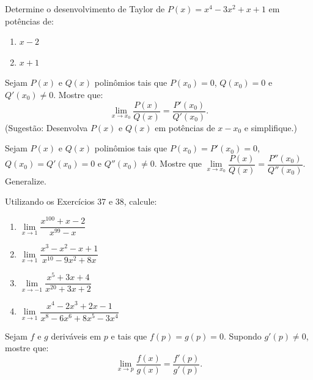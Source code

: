 \begin{exercicio}[36]
\label{ex:7.17.36}
Determine o desenvolvimento de Taylor de $P(x) = x^4 - 3x^2 + x + 1$ em potências de:
\begin{enumerate}[label=\alph*)]
    \item $x - 2$
    \item $x + 1$
\end{enumerate}
\end{exercicio}

\begin{exercicio}[37]
\label{ex:7.17.37}
Sejam $P(x)$ e $Q(x)$ polinômios tais que $P(x_0) = 0$, $Q(x_0) = 0$ e $Q'(x_0) \neq 0$. Mostre que:
\[
\lim_{x \to x_0} \dfrac{P(x)}{Q(x)} = \dfrac{P'(x_0)}{Q'(x_0)}.
\]
(Sugestão: Desenvolva $P(x)$ e $Q(x)$ em potências de $x - x_0$ e simplifique.)
\end{exercicio}

\begin{exercicio}[38]
\label{ex:7.17.38}
Sejam $P(x)$ e $Q(x)$ polinômios tais que $P(x_0) = P'(x_0) = 0$, $Q(x_0) = Q'(x_0) = 0$ e $Q''(x_0) \neq 0$. Mostre que $\lim\limits_{x \to x_0} \dfrac{P(x)}{Q(x)} = \dfrac{P''(x_0)}{Q''(x_0)}$. Generalize.
\end{exercicio}

\begin{exercicio}[39]
\label{ex:7.17.39}
Utilizando os Exercícios 37 e 38, calcule:
\begin{enumerate}[label=\alph*)]
    \item $\lim\limits_{x \to 1} \dfrac{x^{100} + x - 2}{x^{99} - x}$
    \item $\lim\limits_{x \to 1} \dfrac{x^3 - x^2 - x + 1}{x^{10} - 9x^2 + 8x}$
    \item $\lim\limits_{x \to -1} \dfrac{x^5 + 3x + 4}{x^{20} + 3x + 2}$
    \item $\lim\limits_{x \to 1} \dfrac{x^4 - 2x^3 + 2x - 1}{x^8 - 6x^6 + 8x^5 - 3x^4}$
\end{enumerate}
\end{exercicio}

\begin{exercicio}[40]
\label{ex:7.17.40}
Sejam $f$ e $g$ deriváveis em $p$ e tais que $f(p) = g(p) = 0$. Supondo $g'(p) \neq 0$, mostre que:
\[
\lim_{x \to p} \dfrac{f(x)}{g(x)} = \dfrac{f'(p)}{g'(p)}.
\]
\end{exercicio}

